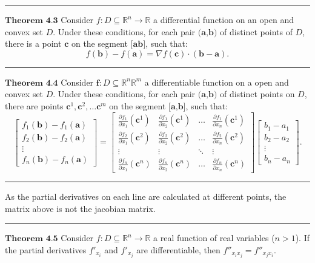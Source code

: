 \documentclass[0pt, a4paper]{article}
\begin{document}
\noindent\rule{\textwidth}{1pt}

$\textbf{Theorem 4.3}$ Consider $f:D\subseteq\mathbb{R}^n\to\mathbb{R}$ a differential function on an open and convex set $D$. Under these conditions, for each pair $\textbf{(a,b)}$ of distinct points of $D$, there is a point $\textbf{c}$ on the segment $\textbf{[ab]}$, such that:
$$f(\textbf{b})-f(\textbf{a})=\nabla f(\textbf{c})\cdot(\textbf{b}-\textbf{a}).$$

\noindent\rule{\textwidth}{1pt}

$\textbf{Theorem 4.4}$ Consider $\textbf{f}:D\subseteq\mathbb{R}^n\mathbb{R}^m$ a differentiable function on a open and convex set $D$. Under these conditions, for each pair $\textbf{(a,b)}$ of distinct points on $D$, there are points $\textbf{c}^1, \textbf{c}^2,\dots\textbf{c}^m$ on the segment $\textbf{[a,b]}$, such that:
$$\begin{bmatrix}
f_1(\textbf{b})-f_1(\textbf{a})\\ 
f_2(\textbf{b})-f_2(\textbf{a})\\ 
\vdots\\ 
f_n(\textbf{b})-f_n(\textbf{a})
\end{bmatrix}
=
\begin{bmatrix}
\frac{\partial f_1}{\partial x_1}(\textbf{c}^1) & \frac{\partial f_1}{\partial x_2}(\textbf{c}^1) & \dots & \frac{\partial f_1}{\partial x_n}(\textbf{c}^1)\\ 
\frac{\partial f_2}{\partial x_1}(\textbf{c}^2) & \frac{\partial f_2}{\partial x_2}(\textbf{c}^2) & \dots & \frac{\partial f_2}{\partial x_n}(\textbf{c}^2)\\  
\vdots & \vdots & \ddots & \vdots\\ 
\frac{\partial f_n}{\partial x_1}(\textbf{c}^n) & \frac{\partial f_n}{\partial x_2}(\textbf{c}^n) & \dots & \frac{\partial f_n}{\partial x_n}(\textbf{c}^n) 
\end{bmatrix}
\begin{bmatrix}
b_1-a_1\\ 
b_2-a_2\\ 
\vdots\\ 
b_n-a_n
\end{bmatrix}.$$
\noindent\rule{\textwidth}{1pt}
As the partial derivatives on each line are calculated at different points, the matrix above is not the jacobian matrix.

\noindent\rule{\textwidth}{1pt}

$\textbf{Theorem 4.5}$ Consider $f:D\subseteq\mathbb{R}^n\to\mathbb{R}$ a real function of real variables ($n>1$). If the partial derivatives $f'_{x_i}$ and $f'_{x_j}$ are differentiable, then $f''_{x_ix_j}=f''_{x_jx_i}$.
\end{document}
